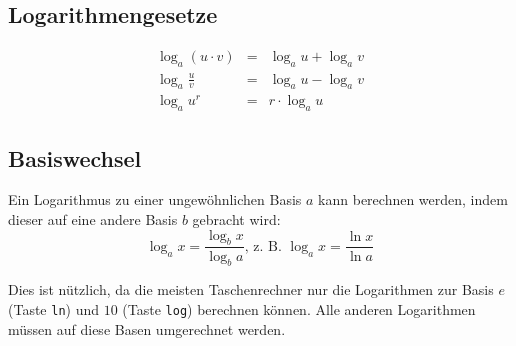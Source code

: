 \subsection{Logarithmengesetze}
\begin{eqnarray*}
\log_a(u\cdot v)  & = & \log_a u + \log_a v \\
\log_a\frac{u}{v} & = & \log_a u - \log_a v \\
\log_a u^r        & = & r\cdot \log_a u 
\end{eqnarray*}

\subsection{Basiswechsel}
Ein Logarithmus zu einer ungewöhnlichen Basis $a$ kann berechnen werden, indem
dieser auf eine andere Basis $b$ gebracht wird:
\[\log_a x = \frac{\log_b x}{\log_b a} \text{, z.~B. } \log_a x =
\frac{\ln x}{\ln a}\]

\noindent Dies ist nützlich, da die meisten Taschenrechner nur die Logarithmen
zur Basis $e$ (Taste \texttt{ln}) und $10$ (Taste \texttt{log}) berechnen
können. Alle anderen Logarithmen müssen auf diese Basen umgerechnet werden.


